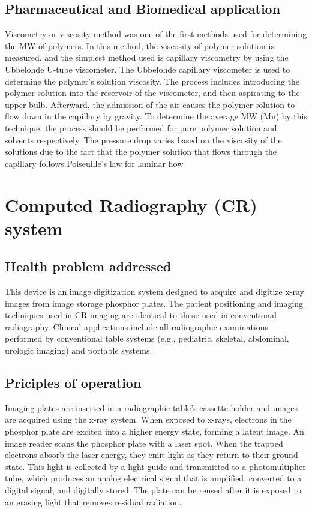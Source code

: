 \documentclass[a4paper,12pt]{report}
\begin{document}
\section{Pharmaceutical and Biomedical application}
Viscometry or viscosity method was one of the first methods used for determining the MW of polymers. In this method, the viscosity of polymer solution is measured, and the simplest method used is capillary viscometry by using the Ubbelohde U-tube viscometer. The Ubbelohde capillary viscometer is used to determine the polymer’s solution viscosity. The process includes introducing the polymer solution into the reservoir of the viscometer, and then aspirating to the upper bulb. Afterward, the admission of the air causes the polymer solution to flow down in the capillary by gravity. To determine the average MW (Mn) by this technique, the process should be performed for pure polymer solution and solvents respectively. The pressure drop  varies based on the viscosity  of the solutions due to the fact that the polymer solution that flows through the capillary follows Poiseuille’s law for laminar flow



\chapter{Computed Radiography (CR) system}
\section{Health problem addressed}
This device is an image digitization system designed to acquire and digitize x-ray images from image storage phosphor plates. The patient positioning and imaging techniques used in CR imaging are identical to those used in conventional radiography. Clinical applications include all radiographic examinations performed by conventional table systems (e.g., pediatric, skeletal, abdominal, urologic imaging) and portable systems.
\section{Priciples of operation}
Imaging plates are inserted in a radiographic table’s cassette holder and images are acquired using the x-ray system. When exposed to x-rays, electrons in the phosphor plate are excited into a higher energy state, forming a latent image. An image reader scans the phosphor plate with a laser spot. When the trapped electrons absorb the laser energy, they emit light as they return to their ground state. This light is collected by a light guide and transmitted to a photomultiplier tube, which produces an analog electrical signal that is amplified, converted to a digital signal, and digitally stored. The plate can be reused after it is exposed to an erasing light that removes residual radiation.
\end{document}
